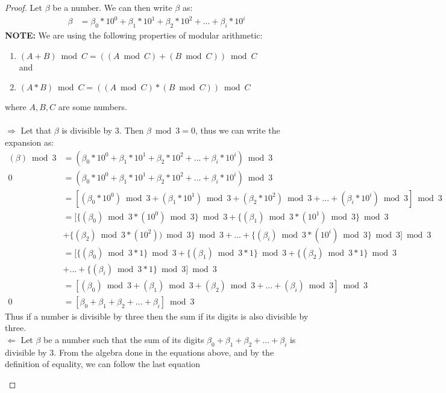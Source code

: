 \documentclass[12pt, fullpage]{article}
\begin{document}
\begin{proof}
 Let $\beta$ be a number. We can then write $\beta$ as:
\begin{align*}
\beta &= \beta_0*10^0 + \beta_1 * 10^1 + \beta_2 * 10^2 + ... + \beta_i * 10^i
\end{align*}
\textbf{NOTE: }We are using the following properties of modular arithmetic:
\begin{enumerate}
\item
	$(A + B) \bmod C = ((A \bmod C) + (B \bmod C)) \bmod C$
	\\and
\item
	$(A * B) \bmod C = ((A \bmod C) * (B \bmod C)) \bmod C$
\end{enumerate}
where $A,B,C$ are some numbers.\\ \\
$\Rightarrow$ Let that $\beta$ is divisible by 3. Then $\beta\bmod 3 = 0$, thus we can write the expansion as: 
\begin{align*}
(\beta)\bmod 3 &= ( \beta_0*10^0 + \beta_1 * 10^1 + \beta_2 * 10^2 + ... + \beta_i * 10^i ) \bmod 3\\
0 &= ( \beta_0*10^0 + \beta_1 * 10^1 + \beta_2 * 10^2 + ... + \beta_i * 10^i ) \bmod 3  \\
&= [ (\beta_0*10^0) \bmod 3 + (\beta_1 * 10^1) \bmod 3 + (\beta_2 * 10^2) \bmod 3 + ... + (\beta_i * 10^i) \bmod 3 ]\bmod 3 \\
&= [ \{(\beta_0)\bmod 3*(10^0)\bmod3\} \bmod 3 + \{(\beta_1)\bmod 3 * (10^1)\bmod 3\} \bmod 3 \\& +\{(\beta_2)\bmod 3 * (10^2))\bmod 3\} \bmod 3 + ... + \{(\beta_i)\bmod 3 * (10^i)\bmod 3\} \bmod 3 ]\bmod 3 \\
&=[\{(\beta_0)\bmod 3*1\} \bmod 3 + \{(\beta_1)\bmod 3 * 1\} \bmod 3 +\{(\beta_2)\bmod 3 * 1\}\bmod 3 \\& + ... + \{(\beta_i)\bmod 3 * 1\} \bmod 3 ]\bmod 3\\
&= [ (\beta_0) \bmod 3 + (\beta_1)\bmod 3+(\beta_2)\bmod 3 + ... + (\beta_i)\bmod 3 ]\bmod 3\\
0 &= [ \beta_0+ \beta_1 + \beta_2 + ... + \beta_i ]\bmod 3
\end{align*}
Thus if a number is divisible by three then the sum if its digits is also divisible by three.\\
$\Leftarrow$ Let $\beta$ be a number such that the sum of its digits $\beta_0+ \beta_1 + \beta_2 + ... + \beta_i $ is divisible by 3. From the algebra done in the equations above, and by the definition of equality, we can follow the last equation\\ \begin{center}

\end{center}
\end{proof}
\end{document}
